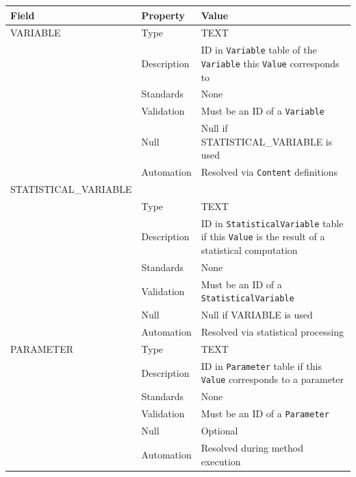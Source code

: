 \documentclass[
]{article}
\newcounter{none} %
\begin{document}
{\def\LTcaptype{none} %
\begin{longtable}[]{@{}
  >{\raggedright\arraybackslash}p{}
  >{\raggedright\arraybackslash}p{}
  >{\raggedright\arraybackslash}p{}@{}}
\toprule\noalign{}
\begin{minipage}[b]{\linewidth}\raggedright
Field
\end{minipage} & \begin{minipage}[b]{\linewidth}\raggedright
Property
\end{minipage} & \begin{minipage}[b]{\linewidth}\raggedright
Value
\end{minipage} \\
\midrule\noalign{}
\endhead
\bottomrule\noalign{}
\endlastfoot
VARIABLE & Type & TEXT \\
& Description & ID in \texttt{Variable} table of the \texttt{Variable}
this \texttt{Value} corresponds to \\
& Standards & None \\
& Validation & Must be an ID of a \texttt{Variable} \\
& Null & Null if STATISTICAL\_VARIABLE is used \\
& Automation & Resolved via \texttt{Content} definitions \\
STATISTICAL\_VARIABLE & & \\
& Type & TEXT \\
& Description & ID in \texttt{StatisticalVariable} table if this
\texttt{Value} is the result of a statistical computation \\
& Standards & None \\
& Validation & Must be an ID of a \texttt{StatisticalVariable} \\
& Null & Null if VARIABLE is used \\
& Automation & Resolved via statistical processing \\
PARAMETER & Type & TEXT \\
& Description & ID in \texttt{Parameter} table if this \texttt{Value}
corresponds to a parameter \\
& Standards & None \\
& Validation & Must be an ID of a \texttt{Parameter} \\
& Null & Optional \\
& Automation & Resolved during method execution \\

\end{longtable}}
\end{document}
